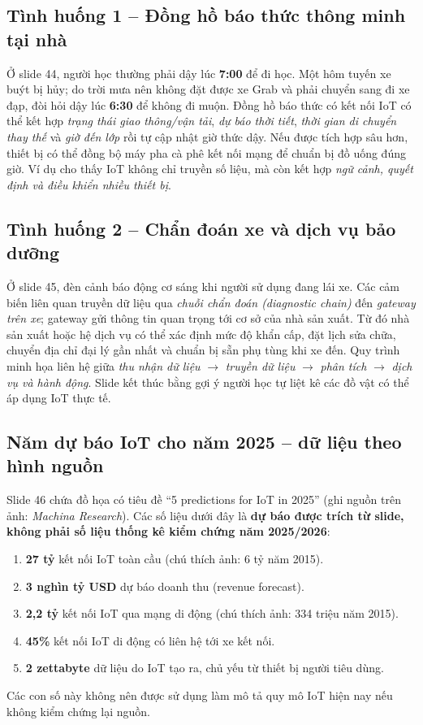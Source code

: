 \subsection{Tình huống 1 -- Đồng hồ báo thức thông minh tại nhà}
Ở slide 44, người học thường phải dậy lúc \textbf{7:00} để đi học. Một hôm tuyến xe buýt bị hủy; do trời mưa nên không đặt được xe Grab và phải chuyển sang đi xe đạp, đòi hỏi dậy lúc \textbf{6:30} để không đi muộn. Đồng hồ báo thức có kết nối IoT có thể kết hợp \emph{trạng thái giao thông/vận tải}, \emph{dự báo thời tiết}, \emph{thời gian di chuyển thay thế} và \emph{giờ đến lớp} rồi tự cập nhật giờ thức dậy. Nếu được tích hợp sâu hơn, thiết bị có thể đồng bộ máy pha cà phê kết nối mạng để chuẩn bị đồ uống đúng giờ. Ví dụ cho thấy IoT không chỉ truyền số liệu, mà còn kết hợp \emph{ngữ cảnh, quyết định và điều khiển nhiều thiết bị}.

\subsection{Tình huống 2 -- Chẩn đoán xe và dịch vụ bảo dưỡng}
Ở slide 45, đèn cảnh báo động cơ sáng khi người sử dụng đang lái xe. Các cảm biến liên quan truyền dữ liệu qua \emph{chuỗi chẩn đoán (diagnostic chain)} đến \emph{gateway trên xe}; gateway gửi thông tin quan trọng tới cơ sở của nhà sản xuất. Từ đó nhà sản xuất hoặc hệ dịch vụ có thể xác định mức độ khẩn cấp, đặt lịch sửa chữa, chuyển địa chỉ đại lý gần nhất và chuẩn bị sẵn phụ tùng khi xe đến. Quy trình minh họa liên hệ giữa \emph{thu nhận dữ liệu} $\to$ \emph{truyền dữ liệu} $\to$ \emph{phân tích} $\to$ \emph{dịch vụ và hành động}. Slide kết thúc bằng gợi ý người học tự liệt kê các đồ vật có thể áp dụng IoT thực tế.

\subsection{Năm dự báo IoT cho năm 2025 -- dữ liệu theo hình nguồn}
Slide 46 chứa đồ họa có tiêu đề ``5 predictions for IoT in 2025'' (ghi nguồn trên ảnh: \emph{Machina Research}). Các số liệu dưới đây là \textbf{dự báo được trích từ slide, không phải số liệu thống kê kiểm chứng năm 2025/2026}:
\begin{enumerate}
\item \textbf{27 tỷ} kết nối IoT toàn cầu (chú thích ảnh: 6 tỷ năm 2015).
\item \textbf{3 nghìn tỷ USD} dự báo doanh thu (revenue forecast).
\item \textbf{2,2 tỷ} kết nối IoT qua mạng di động (chú thích ảnh: 334 triệu năm 2015).
\item \textbf{45\%} kết nối IoT di động có liên hệ tới xe kết nối.
\item \textbf{2 zettabyte} dữ liệu do IoT tạo ra, chủ yếu từ thiết bị người tiêu dùng.
\end{enumerate}
Các con số này không nên được sử dụng làm mô tả quy mô IoT hiện nay nếu không kiểm chứng lại nguồn.

